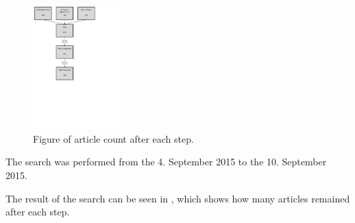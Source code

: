 \begin{figure}
	\includegraphics[width=0.3\textwidth]{Images/LiteratureResultCount.pdf}
	\caption{Figure of article count after each step.}
	\label{fig:articlecount}
\end{figure}

The search was performed from the 4. September 2015 to the 10. September 2015.

The result of the search can be seen in , which shows how many articles remained after each step.